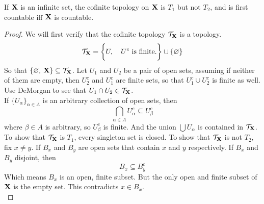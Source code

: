 \documentclass[../../main.tex]{subfiles}
\begin{document}
\begin{wts}
    If ${\mathbf{X}}$ is an infinite set, the cofinite topology on ${\mathbf{X}}$ is $T_1$ but not $T_2$, and is first countable iff ${\mathbf{X}}$ is countable.
\end{wts}
\begin{proof}
    We will first verify that the cofinite topology $\mathcal{T}_{\mathbf{X}}$ is a topology. 
    \[
        \mathcal{T}_{\mathbf{X}} = \biggl\{{U,\quad U^c \text{ is finite.}}\biggr\}\cup \{\varnothing\}
    \]
    So that $\{\varnothing,\: {\mathbf{X}}\}\subseteq\mathcal{T}_{\mathbf{X}}$. Let $U_1$ and $U_2$ be a pair of open sets, assuming if neither of them are empty, then $U_2^c$ and $U_1^c$ are finite sets, so that $U_1^c\cup U_2^c$ is finite as well. Use DeMorgan to see that $U_1\cap U_2\in\mathcal{T}_{\mathbf{X}}$.\\

    If $\{U_\alpha\}_{\alpha\in A}$ is an arbitrary collection of open sets, then 
    \[
        \bigcap_{\alpha\in A} U_\alpha^c\subseteq U_\beta^c
    \]
    where $\beta\in A$ is arbitrary, so $U_\beta^c$ is finite. And the union $\bigcup U_\alpha$ is contained in $\mathcal{T}_{\mathbf{X}}$.\\

    To show that $\mathcal{T}_{\mathbf{X}}$ is $T_1$, every singleton set is closed. To show that $\mathcal{T}_{\mathbf{X}}$ is not $T_2$, fix $x\neq y$. If $B_x$ and $B_y$ are open sets that contain $x$ and $y$ respectively. If $B_x$ and $B_y$ disjoint, then 
    \[
        B_x\subseteq B_y^c
    \]
    Which means $B_x$ is an open, finite subset. But the only open and finite subset of ${\mathbf{X}}$ is the empty set. This contradicts $x\in B_x$.\\


\end{proof}
\end{document}
